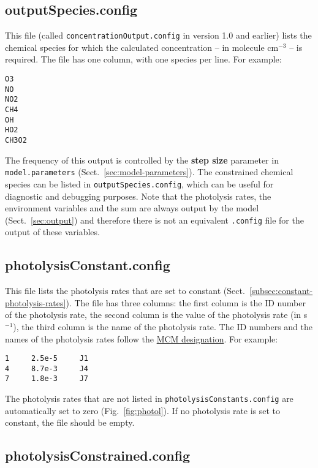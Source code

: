 \subsection{outputSpecies.config} \label{subsec:outputspecies}

This file (called \texttt{concentrationOutput.config} in version 1.0
and earlier) lists the chemical species for which the calculated
concentration -- in molecule cm$^{-3}$ -- is required. The file has
one column, with one species per line. For example:

\begin{verbatim}
O3
NO
NO2
CH4
OH
HO2
CH3O2
\end{verbatim}

The frequency of this output is controlled by the \textbf{step size}
parameter in \texttt{model.parameters} (Sect.~\ref{sec:model-parameters}).
The constrained chemical species can be listed in
\texttt{outputSpecies.config}, which can be useful for diagnostic and
debugging purposes. Note that the photolysis rates, the environment
variables and the  sum are always output by the model
(Sect.~\ref{sec:output}) and therefore there is not an equivalent
\texttt{.config} file for the output of these variables.

\subsection{photolysisConstant.config} \label{subsec:photolysisconstant}

This file lists the photolysis rates that are set to constant
(Sect.~\ref{subsec:constant-photolysis-rates}). The file has three
columns: the first column is the ID number of the photolysis rate, the
second column is the value of the photolysis rate (in s$^{-1}$), the
third column is the name of the photolysis rate. The ID numbers and
the names of the photolysis rates follow the
\href{http://mcm.york.ac.uk/parameters/photolysis.htt}{MCM designation}.
For example:

\begin{verbatim}
1     2.5e-5     J1
4     8.7e-3     J4
7     1.8e-3     J7
\end{verbatim}

The photolysis rates that are not listed in
\texttt{photolysisConstants.config} are automatically set to zero
(Fig.~\ref{fig:photol}). If no photolysis rate is set to constant, the
file should be empty.

\subsection{photolysisConstrained.config} \label{subsec:photolysisconstrained}

